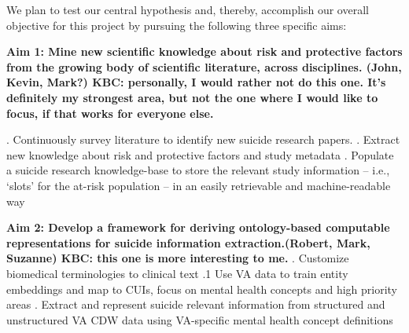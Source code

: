 We plan to test our central hypothesis and, thereby, accomplish our overall objective for this project by pursuing the following three specific aims: 

\textbf{Aim 1: Mine new scientific knowledge about risk and protective factors from the growing body of scientific literature, across disciplines. (John, Kevin, Mark?) KBC: personally, I would rather not do this one.  It's definitely my strongest area, but not the one where I would like to focus, if that works for everyone else.}

. Continuously survey literature to identify new suicide research papers. 
. Extract new knowledge about risk and protective factors and study metadata 
. Populate a suicide research knowledge-base to store the relevant study information -- i.e., `slots' for the at-risk population -- in an easily retrievable and machine-readable way

\textbf{Aim 2: Develop a framework for deriving ontology-based computable representations for suicide information extraction.(Robert, Mark, Suzanne) KBC: this one is more interesting to me.}
. Customize biomedical terminologies to clinical text 
.1 Use VA data to train entity embeddings and map to CUIs, focus on mental health concepts and high priority areas
. Extract and represent suicide relevant information from structured and unstructured VA CDW data using VA-specific mental health concept definitions

